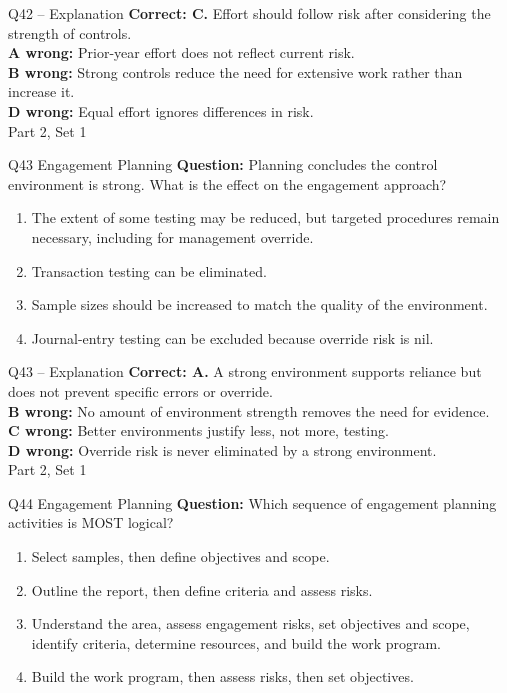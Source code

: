\documentclass[aspectratio=169,10pt]{beamer}
\begin{document}
\begin{frame}[t]{Q42 -- Explanation}
	\footnotesize
	\textbf{Correct: C.} Effort should follow risk after considering the strength of controls. \\[5pt]
\textbf{A wrong:} Prior-year effort does not reflect current risk. \\[3pt]
\textbf{B wrong:} Strong controls reduce the need for extensive work rather than increase it. \\[3pt]
\textbf{D wrong:} Equal effort ignores differences in risk. \\[3pt]
	\vfill {\tiny Part 2, Set 1}
\end{frame}
\begin{frame}[t]{Q43 \hfill {\scriptsize Engagement Planning}}
	\small
	\textbf{Question:} Planning concludes the control environment is strong. What is the effect on the engagement approach?
	\begin{enumerate}[label=\Alph*.,itemsep=1pt,topsep=3pt]
			\item The extent of some testing may be reduced, but targeted procedures remain necessary, including for management override.
			\item Transaction testing can be eliminated.
			\item Sample sizes should be increased to match the quality of the environment.
			\item Journal-entry testing can be excluded because override risk is nil.
	\end{enumerate}
\end{frame}
\begin{frame}[t]{Q43 -- Explanation}
	\footnotesize
	\textbf{Correct: A.} A strong environment supports reliance but does not prevent specific errors or override. \\[5pt]
\textbf{B wrong:} No amount of environment strength removes the need for evidence. \\[3pt]
\textbf{C wrong:} Better environments justify less, not more, testing. \\[3pt]
\textbf{D wrong:} Override risk is never eliminated by a strong environment. \\[3pt]
	\vfill {\tiny Part 2, Set 1}
\end{frame}
\begin{frame}[t]{Q44 \hfill {\scriptsize Engagement Planning}}
	\small
	\textbf{Question:} Which sequence of engagement planning activities is MOST logical?
	\begin{enumerate}[label=\Alph*.,itemsep=1pt,topsep=3pt]
			\item Select samples, then define objectives and scope.
			\item Outline the report, then define criteria and assess risks.
			\item Understand the area, assess engagement risks, set objectives and scope, identify criteria, determine resources, and build the work program.
			\item Build the work program, then assess risks, then set objectives.
	\end{enumerate}
\end{frame}
\end{document}
